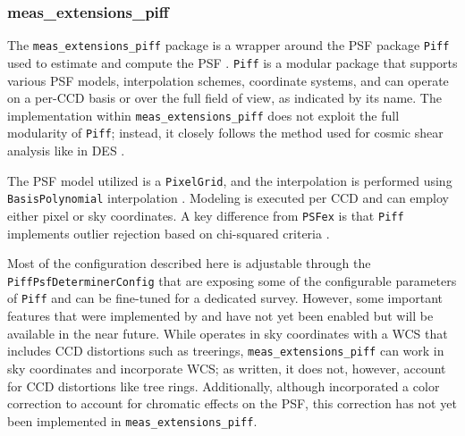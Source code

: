 \subsubsection{meas\_extensions\_piff}


The \texttt{meas\_extensions\_piff} package is a wrapper around the PSF package \texttt{Piff} used to estimate and compute the PSF \citep{2021ascl.soft02024J,2021MNRAS.501.1282J}.
\texttt{Piff} is a modular package that supports various PSF models, interpolation schemes, coordinate systems, and can operate on
a per-CCD basis or over the full field of view, as indicated by its name.
The implementation within  \texttt{meas\_extensions\_piff} does not exploit the full modularity of \texttt{Piff}; instead, it closely follows the method used for cosmic shear analysis like in DES \citep{2021MNRAS.501.1282J,2025OJAp....8E..26S}.

The PSF model utilized is a \texttt{PixelGrid}, and the interpolation is performed using \texttt{BasisPolynomial} interpolation \citep{2021MNRAS.501.1282J}.
Modeling is executed per CCD and can employ either pixel or sky coordinates.
A key difference from \texttt{PSFex} is that  \texttt{Piff} implements outlier rejection based on chi-squared criteria \citep[see][for more details]{2021MNRAS.501.1282J}.

Most of the configuration described here is adjustable through the \texttt{PiffPsfDeterminerConfig} that are exposing some of the configurable parameters of \texttt{Piff} and can be fine-tuned for a dedicated survey.
However, some important features that were implemented by \citet{2021MNRAS.501.1282J} and \citet{2025OJAp....8E..26S} have not yet been enabled but will be available in the near future.
While \citet{2021MNRAS.501.1282J} operates in sky coordinates with a WCS that includes CCD distortions such as treerings,  \texttt{meas\_extensions\_piff} can work in sky coordinates and incorporate WCS; as written, it does not, however, account for CCD distortions like tree rings.
Additionally, although \citet{2025OJAp....8E..26S} incorporated a color correction to account for chromatic effects on the PSF, this correction has not yet been implemented in  \texttt{meas\_extensions\_piff}.
